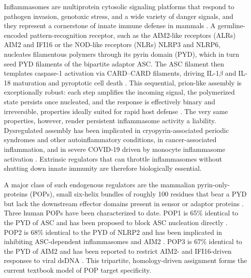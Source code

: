 \documentclass[11pt]{article}
\begin{document}
Inflammasomes are multiprotein cytosolic signaling platforms that respond to
pathogen invasion, genotoxic stress, and a wide variety of danger signals,
and they represent a cornerstone of innate immune defense in mammals
\citep{broz2016inflammasomes, tartey2019inflammasomes}. A germline-encoded
pattern-recognition receptor, such as the AIM2-like receptors (ALRs) AIM2
and IFI16 or the NOD-like receptors (NLRs) NLRP3 and NLRP6, nucleates
filamentous polymers through its pyrin domain (PYD), which in turn seed
PYD filaments of the bipartite adaptor ASC. The ASC filament then templates
caspase-1 activation via CARD--CARD filaments, driving IL-1$\beta$ and IL-18
maturation and pyroptotic cell death
\citep{lu2014unified, hornung2009aim2, fernandesalnemri2009aim2,
roberts2009hin200}. This sequential, prion-like assembly is exceptionally
robust: each step amplifies the incoming signal, the polymerized state
persists once nucleated, and the response is effectively binary and
irreversible, properties ideally suited for rapid host defense
\citep{cai2014prion, franklin2014adaptor, matyszewski2018digital}. The very
same properties, however, render persistent inflammasome activity a liability.
Dysregulated assembly has been implicated in cryopyrin-associated periodic
syndromes and other autoinflammatory conditions, in cancer-associated
inflammation, and in severe COVID-19 driven by monocyte inflammasome
activation \citep{sharma2018pyrin, vora2021inflammasome, junqueira2022sarscov2}.
Extrinsic regulators that can throttle inflammasomes without shutting down
innate immunity are therefore biologically essential.

A major class of such endogenous regulators are the mammalian
pyrin-only-proteins (POPs), small six-helix bundles of roughly 100 residues
that bear a PYD but lack the downstream effector domains present in sensor
or adaptor proteins \citep{indramohan2018cops}. Three human POPs have been
characterized to date. POP1 is 65\% identical to the PYD of ASC and has been
proposed to block ASC nucleation directly \citep{dealmeida2015pyrin}. POP2
is 68\% identical to the PYD of NLRP2 and has been implicated in inhibiting
ASC-dependent inflammasomes and AIM2 \citep{periasamy2017pop2,
ratsimandresy2017pop2}. POP3 is 67\% identical to the PYD of AIM2 and has
been reported to restrict AIM2- and IFI16-driven responses to viral dsDNA
\citep{khare2014pop3}. This tripartite, homology-driven assignment forms
the current textbook model of POP target specificity.
\end{document}
